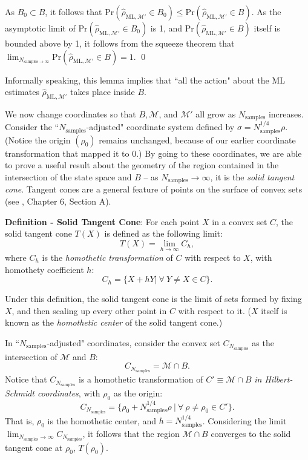 \documentclass[aps,pra, twocolumn]{revtex4-1}
\newcommand{\M}{\mathcal{M}}
\newcommand{\rhohat}{\hat{\rho}}
\newcommand{\rhoML}[1]{\rhohat_{\scriptscriptstyle{\mathrm{ML},#1}}}
\begin{document}
As $B_{0} \subset B$, it follows that $\mathrm{Pr}(\rhoML{\M'} \in B_{0}) \leq \mathrm{Pr}(\rhoML{\M'} \in B)$. As the asymptotic limit of $\mathrm{Pr}(\rhoML{\M'} \in B_{0})$ is 1, and $\mathrm{Pr}(\rhoML{\M'} \in B)$ itself is bounded above by 1, it follows from the squeeze theorem that $\lim_{N_{\mathrm{samples}\rightarrow \infty}}\mathrm{Pr}(\rhoML{\M'} \in B)=1$. \qed

Informally speaking, this lemma implies that ``all the action" about the ML estimates $\rhoML{\M'}$ takes place inside $B$.

We now change coordinates so that $B, \M$, and $\M'$ all grow as $N_{\mathrm{samples}}$ increases. Consider the ``$N_{\mathrm{samples}}$-adjusted" coordinate system defined by $\sigma =  N^{1/4}_{\mathrm{samples}}\rho$. (Notice the origin $(\rho_{0})$ remains unchanged, because of our earlier coordinate transformation that mapped it to 0.) By going to these coordinates, we are able to prove a useful result about the geometry of the region contained in the intersection of the state space and $B$ --  as $N_{\mathrm{samples}} \rightarrow \infty$, it is the \emph{solid tangent cone}. Tangent cones are a general feature of points on the surface of convex sets (see \cite{Rockafellar1998}, Chapter 6, Section A).

\textbf{Definition - Solid Tangent Cone}: For each point $X$ in a convex set $C$, the solid tangent cone $T(X)$ is defined as the following limit:
\[T(X) = \lim_{h\rightarrow \infty} C_{h},\]
where $C_{h}$ is the \emph{homothetic transformation} of $C$ with respect to $X$, with homothety coefficient $h$:
\[C_{h} = \{X + hY  |~\forall ~Y \neq X \in C\}.\]

Under this definition, the solid tangent cone is the limit of sets formed by fixing $X$, and then scaling up every other point in $C$ with respect to it. ($X$ itself is known as the \emph{homothetic center} of the solid tangent cone.) 

In ``$N_{\mathrm{samples}}$-adjusted" coordinates, consider the convex set  $C_{N_{\mathrm{samples}}}$ as the intersection of $\M$ and $B$:
\[C_{N_{\mathrm{samples}}} = \M \cap B.\]
Notice that $C_{N_{\mathrm{samples}}}$ is a homothetic transformation of $C' \equiv \M \cap B$ \emph{in Hilbert-Schmidt coordinates}, with $\rho_{0}$ as the origin:
\[C_{N_{\mathrm{samples}}} = \{\rho_{0} + N^{1/4}_{\mathrm{samples}}\rho~|~\forall~\rho \neq \rho_{0} \in C'\}.\]
That is, $\rho_{0}$ is the homothetic center, and $h = N_{\mathrm{samples}}^{1/4}$.
Considering the limit $\lim_{N_{\mathrm{samples}} \rightarrow \infty} C_{N_{\mathrm{samples}}}$, it follows that the region $\M \cap B$ converges to the solid tangent cone at $\rho_{0}$,  $T(\rho_{0})$.
\end{document}
